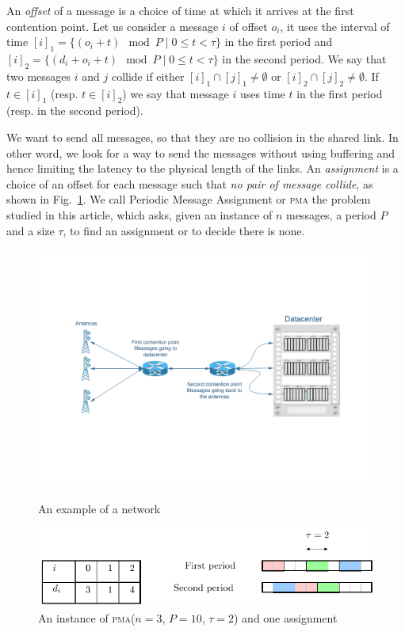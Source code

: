 \documentclass[10pt, conference, letterpaper]{algotel}
\newcommand\pma{\textsc{pma}\xspace}
\begin{document}
An \emph{offset} of a message is a choice of time at which it arrives
at the first contention point. Let us consider a message $i$
of offset $o_i$, it uses the interval of time $[i]_1 = \{ (o_i + t) \mod P \mid 0 \leq t < \tau \}$ in the first period and $[i]_2 = \{ (d_i + o_i + t) \mod P \mid 0 \leq t < \tau \}$ in the second period. We say that two messages $i$ and $j$ collide if either $[i]_1 \cap [j]_1 \neq \emptyset $ or $[i]_2 \cap [j]_2 \neq \emptyset $. If $t \in [i]_1$ (resp. $t \in [i]_2$) we say that message $i$ uses time $t$ in the first period (resp. in the second period).

We want to send all messages, so that they are no collision in the shared link.
In other word, we look for a way to send the messages without using buffering and 
hence limiting the latency to the physical length of the links. An \emph{assignment} is a
choice of an offset for each message such that \emph{no pair of message collide}, as shown in Fig.~\ref{fig:assignment}.  
We call Periodic Message Assignment or \pma the problem studied in this article,
which asks, given an instance of $n$ messages, a period $P$ and a size $\tau$, to find 
an assignment or to decide there is none.
\begin{figure}
\begin{minipage}[c]{.45\linewidth}


\includegraphics[scale=0.25]{network}
\caption{An example of a network}
\label{fig:network}
\end{minipage}
\begin{minipage}[c]{.5\linewidth}



\begin{center}
\includegraphics[scale=0.5]{instance}
\end{center}
\caption{An instance of \pma ($n=3$, $P= 10$, $\tau = 2$) and one assignment}
\label{fig:assignment}

\end{minipage}
\end{figure}
\end{document}
